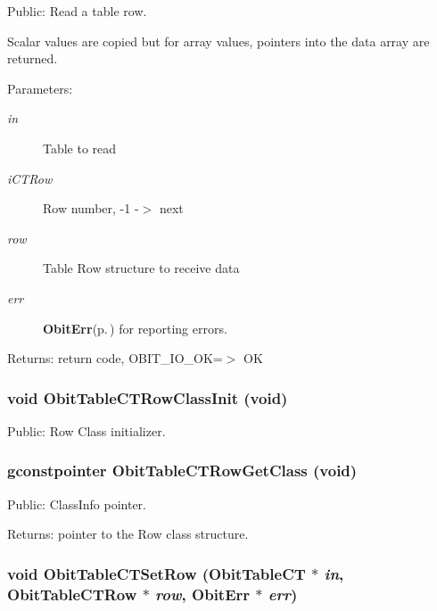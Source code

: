 Public: Read a table row. 

Scalar values are copied but for array values, pointers into the data array are returned. \begin{Desc}
\item[Parameters:]
\begin{description}
\item[{\em in}]Table to read \item[{\em i\-CTRow}]Row number, -1 -$>$ next \item[{\em row}]Table Row structure to receive data \item[{\em err}]{\bf Obit\-Err}{\rm (p.\,\pageref{structObitErr})} for reporting errors. \end{description}
\end{Desc}
\begin{Desc}
\item[Returns:]return code, OBIT\_\-IO\_\-OK=$>$ OK \end{Desc}
\subsubsection{\setlength{\rightskip}{0pt plus 5cm}void Obit\-Table\-CTRow\-Class\-Init (void)}\label{ObitTableCT_8h_a7}


Public: Row Class initializer. 

\subsubsection{\setlength{\rightskip}{0pt plus 5cm}gconstpointer Obit\-Table\-CTRow\-Get\-Class (void)}\label{ObitTableCT_8h_a9}


Public: Class\-Info pointer. 

\begin{Desc}
\item[Returns:]pointer to the Row class structure. \end{Desc}
\subsubsection{\setlength{\rightskip}{0pt plus 5cm}void Obit\-Table\-CTSet\-Row ({\bf Obit\-Table\-CT} $\ast$ {\em in}, {\bf Obit\-Table\-CTRow} $\ast$ {\em row}, {\bf Obit\-Err} $\ast$ {\em err})}\label{ObitTableCT_8h_a19}


